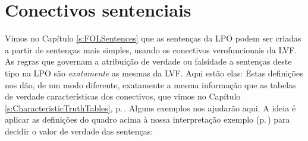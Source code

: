 \section{Conectivos sentenciais}
Vimos no Capítulo \ref{s:FOLSentences} que as sentenças da LPO podem ser criadas a partir de sentenças mais simples, usando os conectivos verofuncionais da LVF. As regras que governam a atribuição de verdade ou falsidade a sentenças deste tipo na LPO são \emph{exatamente} as mesmas da LVF.
Aqui estão elas:
	\label{b:ConSent}
Estas definições nos dão, de um modo diferente, exatamente a mesma informação que as tabelas de verdade características dos conectivos, que vimos no Capítulo \ref{s:CharacteristicTruthTables}, p.\,\pageref{s:CharacteristicTruthTables}.
Alguns exemplos nos ajudarão aqui.
A ideia é aplicar as definições do quadro acima à nossa interpretação exemplo (p.\,\pageref{i:Sample}) para decidir o valor de verdade das sentenças:
